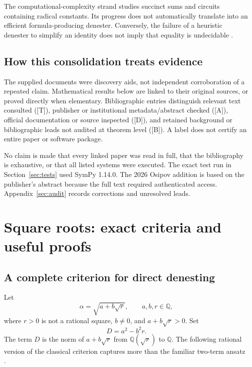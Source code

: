 \documentclass[11pt,a4paper]{article}
\numberwithin{equation}{section}
\theoremstyle{definition}\newtheorem{definition}[theorem]{Definition}
\theoremstyle{remark}\newtheorem{remark}[theorem]{Remark}
\newcommand{\Q}{\mathbb Q}\newcommand{\R}{\mathbb R}\newcommand{\C}{\mathbb C}\newcommand{\Z}{\mathbb Z}
\newcommand{\status}[1]{\textsf{\footnotesize[#1]}}
\begin{document}
The computational-complexity strand studies succinct sums and circuits containing radical constants. Its progress does not automatically translate into an efficient formula-producing denester. Conversely, the failure of a heuristic denester to simplify an identity does not imply that equality is undecidable \cite{bloemer91,bloemer98,rit,gaillard}.

\subsection{How this consolidation treats evidence}
The supplied documents were discovery aids, not independent corroboration of a repeated claim. Mathematical results below are linked to their original sources, or proved directly when elementary. Bibliographic entries distinguish relevant text consulted (\status{T}), publisher or institutional metadata/abstract checked (\status{A}), official documentation or source inspected (\status{D}), and retained background or bibliographic leads not audited at theorem level (\status{B}). A label does not certify an entire paper or software package.

No claim is made that every linked paper was read in full, that the bibliography is exhaustive, or that all listed systems were executed. The exact test run in Section~\ref{sec:tests} used SymPy 1.14.0. The 2026 Osipov addition is based on the publisher's abstract because the full text required authenticated access. Appendix~\ref{sec:audit} records corrections and unresolved leads.

\section{Square roots: exact criteria and useful proofs}
\label{sec:squares}

\subsection{A complete criterion for direct denesting}
Let
\begin{equation}\label{eq:quadratic}
\alpha=\sqrt{a+b\sqrt r},\qquad a,b,r\in\Q,
\end{equation}
where $r>0$ is not a rational square, $b\ne0$, and $a+b\sqrt r>0$. Set
\begin{equation}
D=a^2-b^2r.
\end{equation}
The term $D$ is the norm of $a+b\sqrt r$ from $\Q(\sqrt r)$ to $\Q$. The following rational version of the classical criterion captures more than the familiar two-term ansatz \cite{bfht,gkioulekas}.
\end{document}
